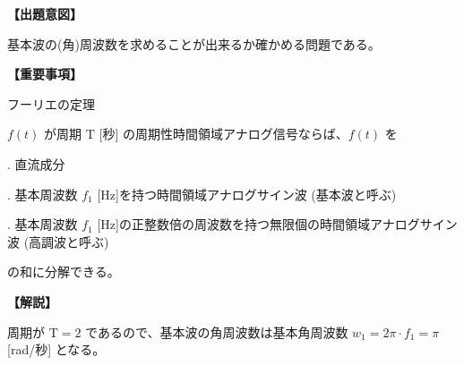 \noindent \textbf{【出題意図】}

\noindent 基本波の(角)周波数を求めることが出来るか確かめる問題である。

\vspace{1em}
\noindent \textbf{【重要事項】}

\noindent フーリエの定理

\smallskip
$f(t)$ が周期 $\textrm{T}$ [秒] の周期性時間領域アナログ信号ならば、$f(t)$ を

. 直流成分

. 基本周波数 $f_1$ [Hz]を持つ時間領域アナログサイン波 (基本波と呼ぶ)

. 基本周波数 $f_1$ [Hz]の正整数倍の周波数を持つ無限個の時間領域アナログサイン波 (高調波と呼ぶ)

\smallskip
の和に分解できる。


\vspace{1em}
\noindent \textbf{【解説】}

\noindent 周期が $\textrm{T}=2$ であるので、基本波の角周波数は基本角周波数 $w_1 = 2\pi\cdot f_1 = \pi$ [rad/秒] となる。
